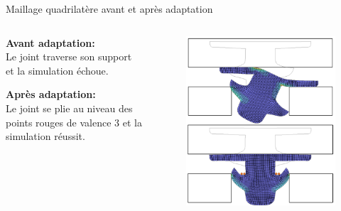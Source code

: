 \begin{frame}{Maillage quadrilatère avant et après adaptation}
    \begin{columns}[T] %
        \begin{column}{.5\textwidth}
        \vspace{1cm}
        \textbf{Avant adaptation:} \\
        Le joint traverse son support et la simulation échoue.
        
        \vspace{1.7cm}
        
        \textbf{Après adaptation:} \\
        Le joint se plie au niveau des points rouges de valence 3 et la simulation réussit.
        \end{column}%
        
        \begin{column}{.5\textwidth}
        \begin{figure}
            \centering
            \includegraphics[width=\linewidth]{img/quadsimu/deformation_same_step.PNG}
        \end{figure}
        \end{column}
    \end{columns}
\end{frame}
